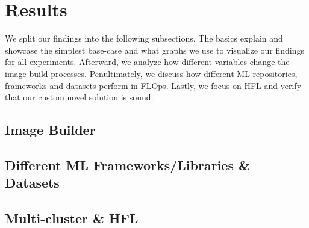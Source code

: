 \section{Results}

We split our findings into the following subsections.
The basics explain and showcase the simplest base-case and what graphs we use to visualize our findings for all experiments.
Afterward, we analyze how different variables change the image build processes.
Penultimately, we discuss how different ML repositories, frameworks and datasets perform in FLOps.
Lastly, we focus on HFL and verify that our custom novel solution is sound.



\subsection{Image Builder}

\subsection{Different ML Frameworks/Libraries \& Datasets}


\subsection{Multi-cluster \& HFL}